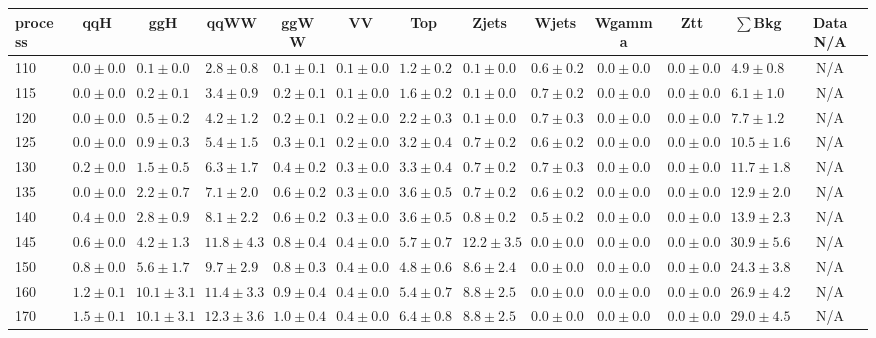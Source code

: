\begin{table}
{%
 \tiny
 \begin{center}
 \begin{tabular}{l | c c | c c c c c c c c  | c c}
 \hline
 process & qqH & ggH & qqWW & ggWW & VV & Top & Zjets & Wjets & Wgamma & Ztt & $\sum$Bkg & Data N/A \\
 \hline
110 & $0.0\pm0.0$ & $0.1\pm0.0$ & $2.8\pm0.8$ & $0.1\pm0.1$ & $0.1\pm0.0$ & $1.2\pm0.2$ & $0.1\pm0.0$ & $0.6\pm0.2$ & $0.0\pm0.0$ & $0.0\pm0.0$ & $4.9\pm0.8$ &N/A \\
115 & $0.0\pm0.0$ & $0.2\pm0.1$ & $3.4\pm0.9$ & $0.2\pm0.1$ & $0.1\pm0.0$ & $1.6\pm0.2$ & $0.1\pm0.0$ & $0.7\pm0.2$ & $0.0\pm0.0$ & $0.0\pm0.0$ & $6.1\pm1.0$ &N/A \\
120 & $0.0\pm0.0$ & $0.5\pm0.2$ & $4.2\pm1.2$ & $0.2\pm0.1$ & $0.2\pm0.0$ & $2.2\pm0.3$ & $0.1\pm0.0$ & $0.7\pm0.3$ & $0.0\pm0.0$ & $0.0\pm0.0$ & $7.7\pm1.2$ & N/A \\
125 & $0.0\pm0.0$ & $0.9\pm0.3$ & $5.4\pm1.5$ & $0.3\pm0.1$ & $0.2\pm0.0$ & $3.2\pm0.4$ & $0.7\pm0.2$ & $0.6\pm0.2$ & $0.0\pm0.0$ & $0.0\pm0.0$ & $10.5\pm1.6$ &  N/A \\
130 & $0.2\pm0.0$ & $1.5\pm0.5$ & $6.3\pm1.7$ & $0.4\pm0.2$ & $0.3\pm0.0$ & $3.3\pm0.4$ & $0.7\pm0.2$ & $0.7\pm0.3$ & $0.0\pm0.0$ & $0.0\pm0.0$ & $11.7\pm1.8$ &  N/A \\
135 & $0.0\pm0.0$ & $2.2\pm0.7$ & $7.1\pm2.0$ & $0.6\pm0.2$ & $0.3\pm0.0$ & $3.6\pm0.5$ & $0.7\pm0.2$ & $0.6\pm0.2$ & $0.0\pm0.0$ & $0.0\pm0.0$ & $12.9\pm2.0$ &  N/A \\
140 & $0.4\pm0.0$ & $2.8\pm0.9$ & $8.1\pm2.2$ & $0.6\pm0.2$ & $0.3\pm0.0$ & $3.6\pm0.5$ & $0.8\pm0.2$ & $0.5\pm0.2$ & $0.0\pm0.0$ & $0.0\pm0.0$ & $13.9\pm2.3$ &  N/A \\
145 & $0.6\pm0.0$ & $4.2\pm1.3$ & $11.8\pm4.3$ & $0.8\pm0.4$ & $0.4\pm0.0$ & $5.7\pm0.7$ & $12.2\pm3.5$ & $0.0\pm0.0$ & $0.0\pm0.0$ & $0.0\pm0.0$ & $30.9\pm5.6$ &  N/A \\
150 & $0.8\pm0.0$ & $5.6\pm1.7$ & $9.7\pm2.9$ & $0.8\pm0.3$ & $0.4\pm0.0$ & $4.8\pm0.6$ & $8.6\pm2.4$ & $0.0\pm0.0$ & $0.0\pm0.0$ & $0.0\pm0.0$ & $24.3\pm3.8$ &  N/A \\
160 & $1.2\pm0.1$ & $10.1\pm3.1$ & $11.4\pm3.3$ & $0.9\pm0.4$ & $0.4\pm0.0$ & $5.4\pm0.7$ & $8.8\pm2.5$ & $0.0\pm0.0$ & $0.0\pm0.0$ & $0.0\pm0.0$ & $26.9\pm4.2$ & N/A \\
170 & $1.5\pm0.1$ & $10.1\pm3.1$ & $12.3\pm3.6$ & $1.0\pm0.4$ & $0.4\pm0.0$ & $6.4\pm0.8$ & $8.8\pm2.5$ & $0.0\pm0.0$ & $0.0\pm0.0$ & $0.0\pm0.0$ & $29.0\pm4.5$ & N/A \\

\end{tabular}
\end{center}}
\end{table}

